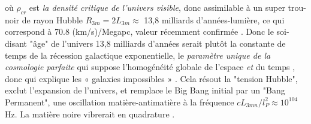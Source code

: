 \documentclass[a4paper,12pt]{article}
\renewcommand{\hbar}{{\mkern0.75mu\mathchar '26\mkern -9.75mu h}}
\newcommand{\lambdabar}{{\mkern0.75mu\mathchar '26\mkern -9.75mu\lambda}}
\begin{document}
où $\rho_{cr}$ est \textit{la densité critique de l'univers visible}, donc assimilable à un super trou-noir de rayon Hubble $ R_{3m} = 2L_{3m} \approx $ 13,8 milliards d'années-lumière, ce qui correspond à 70.8 (km/s)/Megapc, valeur récemment confirmée  \citep{freedman}. Donc le soi-disant "âge" de l'univers 13,8 milliards d'années serait plutôt la constante de temps de la récession galactique exponentielle, le \textit{paramètre unique de la cosmologie parfaite} qui suppose l'homogénéité globale de l'espace \textit{et} du temps \citep{bondi_gold_1948}, donc qui explique les « galaxies impossibles » \citep{sanchez_2024}. Cela résout la "tension Hubble", exclut l'expansion de l'univers, et remplace le Big Bang initial par un "Bang Permanent", une oscillation matière-antimatière à la fréquence $cL_{3mn}/l_P^2 \approx 10^{104}$ Hz. La matière noire vibrerait en quadrature \citep{sanchez_2024}. 
\end{document}
